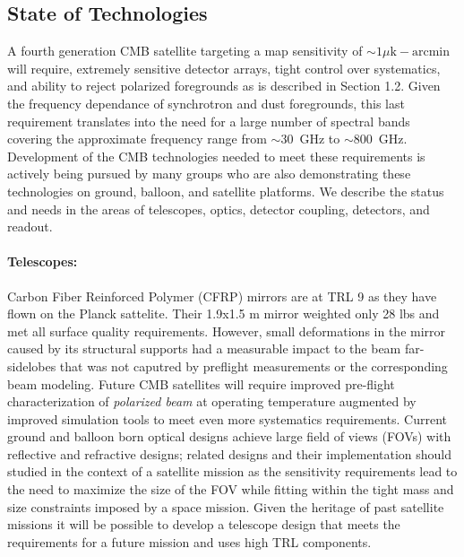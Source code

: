
\subsection{State of Technologies}
\label{sec:technologies}

\vspace{-0.05in}


A fourth generation CMB satellite targeting a map sensitivity of $\sim1 \mu\mathrm{k-arcmin}$ will require, extremely sensitive detector arrays, tight control over systematics, and ability to reject polarized foregrounds as is described in Section 1.2.
Given the frequency dependance of synchrotron and dust foregrounds, this last requirement translates into the need for a large number of spectral bands covering the approximate frequency range from $\sim30$~GHz to $\sim800$~GHz.
Development of the CMB technologies needed to meet these requirements is actively being pursued by many groups who are also demonstrating these technologies on ground, balloon, and satellite platforms.   We describe the status and needs in the areas of telescopes, optics, detector coupling, detectors, and readout.

\paragraph{Telescopes:}  Carbon Fiber Reinforced Polymer (CFRP) mirrors are at TRL 9 as they have flown on the Planck sattelite. Their 1.9x1.5 m mirror weighted only 28 lbs and met all surface quality requirements. However, small deformations in the mirror caused by its structural supports had a measurable impact to the beam far-sidelobes that was not caputred by preflight measurements or the corresponding beam modeling.  Future CMB satellites will require improved pre-flight characterization of {\it polarized beam} at operating temperature augmented by improved simulation tools to meet even more systematics requirements.  Current ground and balloon born optical designs achieve large field of views (FOVs) with reflective and refractive designs; related designs and their implementation should studied in the context of a satellite mission as the sensitivity requirements lead to the need to maximize the size of the FOV while fitting within the tight mass and size constraints imposed by a space mission.  Given the heritage of past satellite missions it will be possible to develop a telescope design that meets the requirements for a future mission and uses high TRL components.

